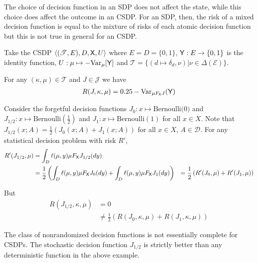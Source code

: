 \begin{example}\label{ex:ired_csdp}
The choice of decision function in an SDP does not affect the state, while this choice does affect the outcome in an CSDP. For an SDP, then, the risk of a mixed decision function is equal to the mixture of risks of each atomic decision function but this is not true in general for an CSDP.

Take the CSDP $\langle (\mathscr{T}, E), D, \mathsf{X}, U \rangle$ where $E=D=\{0,1\}$, $\mathsf{Y}:E\to \{0,1\}$ is the identity function, $U:\mu\mapsto -\text{Var}_\mu[\mathsf{Y}]$ and $\mathscr{T}=\{(d\mapsto \delta_d,\nu)|\nu\in \Delta(\mathcal{E})\}$.

For any $(\kappa,\mu)\in \mathscr{T}$ and $J\in\mathscr{J}$ we have
\begin{align}
    R(J,\kappa,\mu) = 0.25-\text{Var}_{\mu F_{\mathsf{X}} J}(\mathsf{Y})
\end{align}

Consider the forgetful decision functions $J_0:x\mapsto \text{Bernoulli(0)}$ and $J_{1/2}:x\mapsto \mathrm{Bernoulli(\tfrac{1}{2})}$ and $J_1:x\mapsto \mathrm{Bernoulli(1)}$ for all $x\in X$. Note that $J_{1/2}(x;A) = \tfrac{1}{2}(J_0(x;A)+J_1(x;A))$ for all $x\in X$, $A\in \mathcal{D}$. For any statistical decision problem with risk $R'$,
\begin{align}
    R'(J_{1/2},\mu) &= \int_D \ell(\mu,y) \mu F_{\mathsf{X}} J_{1/2}(dy)\\
                    &= \frac{1}{2}\left(\int_D \ell(\mu,y) \mu F_{\mathsf{X}} J_{0}(dy) + \int_D \ell(\mu,y) \mu F_{\mathsf{X}} J_{1}(dy)\right)
                    &= \frac{1}{2}\left(R'(J_0,\mu) + R'(J_1,\mu) \right)
\end{align}

But
\begin{align}
    R(J_{1/2},\kappa,\mu) &= 0\\
                          &\neq \frac{1}{2}\left(R(J_0,\kappa,\mu) + R(J_1,\kappa,\mu)\right)
\end{align}

\end{example}

\begin{corollary}
The class of nonrandomized decision functions is not essentially complete for CSDPs. The stochastic decision function $J_{1/2}$ is strictly better than any deterministic function in the above example.
\end{corollary}


